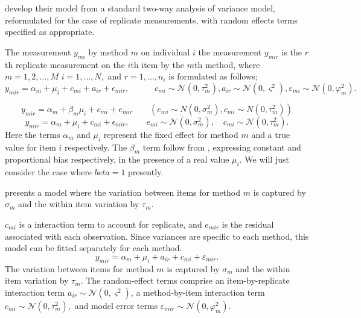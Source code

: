 \documentclass[12pt, a4paper]{report}
\theoremstyle{plain}
\theoremstyle{definition}
\theoremstyle{remark}
\begin{document}
\citet{BXC2008} develop their model from a standard two-way analysis of variance model, reformulated for the case of replicate measurements, with random effects terms specified as appropriate. 



The measurement $y_{mi}$ by method $m$ on individual $i$ the measurement $y_{mir} $ is the $r$th replicate measurement on the $i$th item by the $m$th method, where $m=1,2,\ldots,M$ $i=1,\ldots,N,$ and $r = 1,\ldots,n_i$ is formulated as follows;
\begin{equation}
y_{mir}  = \alpha_{m} + \mu_{i} + c_{mi} + a_{ir} + \epsilon_{mir}, \qquad \quad c_{mi} \sim \mathcal{N}(0,\tau^{2}_{m}) , a_{ir} \sim \mathcal{N}(0,\varsigma^{2}),  \varepsilon_{mi} \sim \mathcal{N}(0,\varphi^{2}_{m}) .
\end{equation}

\begin{equation}
y_{mir}  = \alpha_{m} + \beta_{m}\mu_{i} + c_{mi} + e_{mir} \qquad
( e_{mi} \sim N(0,\sigma^{2}_{m}), c_{mi} \sim N(0,\tau^{2}_{m}))
\end{equation}
\begin{equation}
y_{mir}  = \alpha_{m} + \mu_{i} + c_{mi} + \epsilon_{mir}, \qquad  e_{mi}
\sim \mathcal{N}(0,\sigma^{2}_{m}), \quad c_{mi} \sim \mathcal{N}(0,\tau^{2}_{m}).
\end{equation}
Here the terms $\alpha_{m}$ and $\mu_{i}$ represent the fixed effect for method $m$ and a true value for item $i$ respectively. The $\beta_{m}$ term follow from \citet{DunnSEME}, expressing constant and proportional bias respectively, in the presence of a real value $\mu_{i}.$ We will just consider the case where $beta=1$ presently. 

\citet{BXC2008} presents a model where the variation between items for
method $m$ is captured by $\sigma_m$ and the within item variation
by $\tau_m$. 

$c_{mi}$ is a interaction term to account for replicate, and $e_{mir}$ is the residual associated with each observation. Since variances are specific to each method, this model can be fitted separately for each method.
\begin{equation}\label{BXC-model}
y_{mir}  = \alpha_{m} + \mu_{i} + a_{ir} + c_{mi} + \varepsilon_{mir}.
\end{equation}
The variation between items for method $m$ is captured by $\sigma_m$ and the within item variation by $\tau_m$.	
The random-effect terms comprise an item-by-replicate interaction term $a_{ir} \sim \mathcal{N}(0,\varsigma^{2})$, a method-by-item interaction term $c_{mi} \sim \mathcal{N}(0,\tau^{2}_{m}),$ and model error terms $\varepsilon_{mir} \sim \mathcal{N}(0,\varphi^{2}_{m}).$ 
\end{document}
